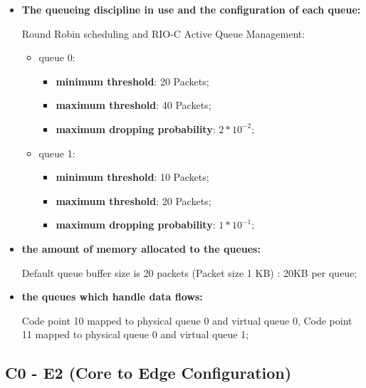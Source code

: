 \documentclass[conference,compsoc]{IEEEtran}
\begin{document}
\begin{itemize}
        \vspace{5mm}
        \item \textbf{The queueing discipline in use and the configuration of each queue:}\par
        Round Robin scheduling and RIO-C Active Queue Management: \par 
        \begin{itemize}
            \item queue 0:
            \begin{itemize}
                \item \textbf{minimum threshold}: 20 Packets;
                \item \textbf{maximum threshold}: 40 Packets;
                \item \textbf{maximum dropping probability}: $2 * 10^{-2}$;
            \end{itemize}
            \item queue 1:
             \begin{itemize}
                \item \textbf{minimum threshold}: 10 Packets;
                \item \textbf{maximum threshold}: 20 Packets;
                \item \textbf{maximum dropping probability}:  $1 * 10^{-1}$;
            \end{itemize}
        \end{itemize}
        
        \vspace{5mm}
        \item \textbf{the amount of memory allocated to the queues:}\par
        
        Default queue buffer size is 20 packets (Packet size 1 KB) : 20KB per queue;
        
        
        \vspace{5mm}
        \item \textbf{the queues which handle data flows:}\par
        Code point 10 mapped to physical queue 0 and virtual queue 0, Code point 11 mapped to physical queue 0 and virtual queue 1;
        
    \end{itemize}
    
    



    \subsection{C0 - E2 (Core to Edge Configuration)}
    
\end{document}
